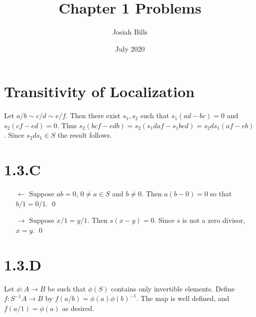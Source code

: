 \documentclass{article}
\title{Chapter 1 Problems}
\author{Josiah Bills}
\date{July 2020}
\begin{document}
\maketitle

\section{Transitivity of Localization}
Let $a/b \sim c/d \sim e/f$. Then there exist $s_1, s_2$ such that
$s_1(ad-bc)=0$ and $s_2(cf-ed)=0$. Thus
$s_2(bcf-edb)=s_2(s_1daf-s_1bed)=s_2ds_1(af-eb)$. Since $s_2ds_1 \in S$ the result follows.

\section{1.3.C}
\begin{itemize}
    \item[$\leftarrow$] Suppose $ab=0$, $0 \not = a \in S$ and $b \not = 0$. Then $a(b-0)=0$ so that $b/1=0/1$. \qed
    \item[$\rightarrow$] Suppose $x/1=y/1$. Then $s(x-y)=0$. Since $s$ is not a zero divisor, $x=y$. \qed
\end{itemize}

\section{1.3.D}
Let $\phi: A \to B$ be such that $\phi(S)$ contains only invertible elements.
Define $f : S^{-1}A \to B$ by $f(a/b)=\phi(a)\phi(b)^{-1}$. The map is well defined,
and $f(a/1)=\phi(a)$ as desired.
\end{document}
